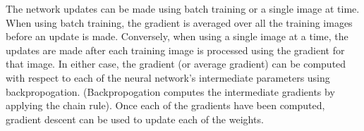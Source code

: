 \documentclass[fleqn]{article}
\begin{document}
\begin{enumerate}
		The network updates can be made using batch training or a single image at time. When using batch training, the gradient is averaged over all the training images before an update is made. Conversely, when using a single image at a time, the updates are made after each training image is processed using the gradient for that image. In either case, the gradient (or average gradient) can be computed with respect to each of the neural network's intermediate parameters using backpropogation. (Backpropogation computes the intermediate gradients by applying the chain rule). Once each of the gradients have been computed, gradient descent can be used to update each of the weights.
	\end{enumerate}
\end{document}
